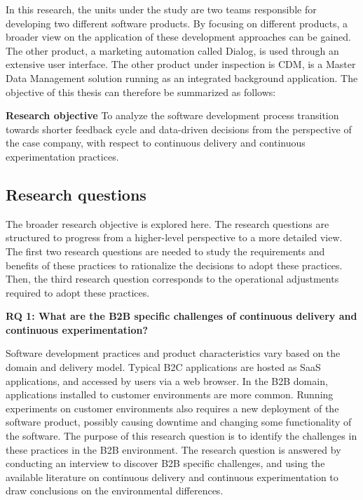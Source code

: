 \documentclass[english]{tktltiki2}
\theoremstyle{definition}
\theoremstyle{remark}
\begin{document}
In this research, the units under the study are two teams responsible for developing two different software products. By focusing on different products, a broader view on the application of these development approaches can be gained. The other product, a marketing automation called Dialog, is used through an extensive user interface. The other product under inspection is CDM, is a Master Data Management \cite{loshin2010master} solution running as an integrated background application. The objective of this thesis can therefore be summarized as follows:

\bigskip
\noindent \textbf{Research objective}
To analyze the software development process transition towards shorter feedback cycle and data-driven decisions from the perspective of the case company, with respect to continuous delivery and continuous experimentation practices.

\subsection{Research questions}

The broader research objective is explored here. The research questions are structured to progress from a higher-level perspective to a more detailed view. The first two research questions are needed to study the requirements and benefits of these practices to rationalize the decisions to adopt these practices. Then, the third research question corresponds to the operational adjustments required to adopt these practices. \newline

\noindent \textbf{RQ 1: What are the B2B specific challenges of continuous delivery and continuous experimentation?}

\noindent Software development practices and product characteristics vary based on the domain and delivery model. Typical B2C applications are hosted as SaaS applications, and accessed by users via a web browser. In the B2B domain, applications installed to customer environments are more common. Running experiments on customer environments also requires a new deployment of the software product, possibly causing downtime and changing some functionality of the software. The purpose of this research question is to identify the challenges in these practices in the B2B environment. The research question is answered by conducting an interview to discover B2B specific challenges, and using the available literature on continuous delivery and continuous experimentation to draw conclusions on the environmental differences.
\newline
\end{document}
